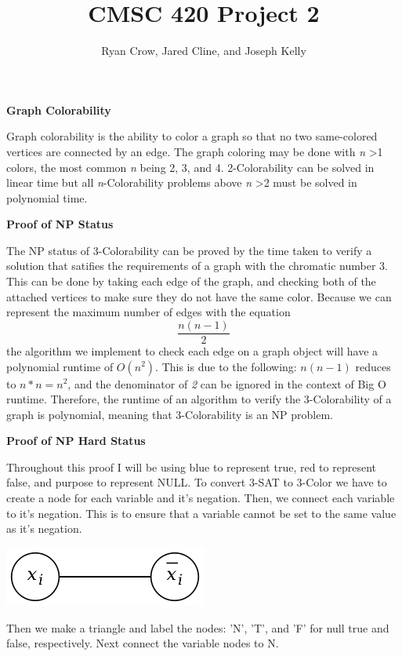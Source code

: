 \documentclass[12pt, letterpaper]{article}
\title{CMSC 420 Project 2}
\author{Ryan Crow, Jared Cline, and Joseph Kelly}
\begin{document}
	\begin{center}
	\textbf{Graph Colorability}
	\end{center}
		Graph colorability is the ability to color a graph so that no two same-colored vertices are connected by an edge.
		The graph coloring may be done with \textit{n} \textgreater 1 colors, the most common \textit{n} being 2, 3, and 4.
		2-Colorability can be solved in linear time but all \textit{n}-Colorability problems above \textit{n} \textgreater 2 
		must be solved in polynomial time.
	\begin{center}
	\textbf{Proof of NP Status}
	\end{center}
		The NP status of 3-Colorability can be proved by the time taken to verify a solution that satifies the requirements 
		of a graph with the chromatic number 3. This can be done by taking each edge of the graph, and checking both of the
		attached vertices to make sure they do not have the same color. Because we can represent the maximum number of edges
		with the equation \[ \frac{n(n - 1)}{2} \] the algorithm we implement to check each edge on a graph object will have
		a polynomial runtime of $O(n^2)$. This is due to the following: \(n(n - 1)\) reduces to \(n * n = n^2\), 
		and the denominator of \textit{2} can be ignored in the context of Big O runtime. Therefore, the runtime of an 
		algorithm to verify the 3-Colorability of a graph is polynomial, meaning that 3-Colorability is an NP problem.
	\begin{center}
	\textbf{Proof of NP Hard Status}
	\end{center}
		Throughout this proof I will be using blue to represent true, red to represent false, and purpose to represent NULL.
		To convert 3-SAT to 3-Color we have to create a node for each variable and it's negation.
		Then, we connect each variable to it's negation. This is to ensure that a variable cannot be set to the same value as it's negation.
		\begin{center}
		\includegraphics[width=0.5\textwidth]{./var.png}
	\end{center}
		Then we make a triangle and label the nodes: 'N', 'T', and 'F' for null true and false, respectively. Next connect the variable nodes to N.
\end{document}
